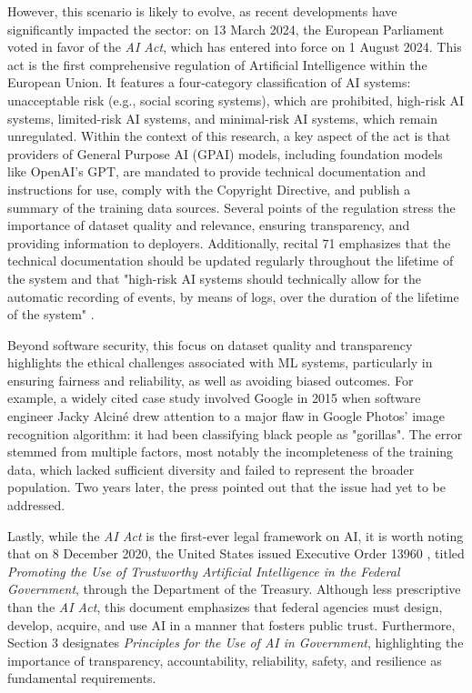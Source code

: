 However, this scenario is likely to evolve, as recent developments have significantly impacted the sector: on 13 March 2024, the European Parliament voted in favor of the \textit{AI Act}, which has entered into force on 1 August 2024.
This act is the first comprehensive regulation of Artificial Intelligence within the European Union. It features a four-category classification of AI systems: unacceptable risk (e.g., social scoring systems), which are prohibited, high-risk AI systems, limited-risk AI systems, and minimal-risk AI systems, which remain unregulated. Within the context of this research, a key aspect of the act is that providers of General Purpose AI (GPAI) models, including foundation models like OpenAI's GPT, are mandated to provide technical documentation and instructions for use, comply with the Copyright Directive, and publish a summary of the training data sources. Several points of the regulation stress the importance of dataset quality and relevance, ensuring transparency, and providing information to deployers. Additionally, recital 71 emphasizes that the technical documentation should be updated regularly throughout the lifetime of the system and that "high-risk AI systems should technically allow for the automatic recording of events, by means of logs, over the duration of the lifetime of the system" \cite{eu_ai_act_2024}.


Beyond software security, this focus on dataset quality and transparency highlights the ethical challenges associated with ML systems, particularly in ensuring fairness and reliability, as well as avoiding biased outcomes. For example, a widely cited case study \cite{winters2020software} involved Google in 2015 when software engineer Jacky Alciné drew attention to a major flaw in Google Photos' image recognition algorithm: it had been classifying black people as "gorillas". The error stemmed from multiple factors, most notably the incompleteness of the training data, which lacked sufficient diversity and failed to represent the broader population. Two years later, the press pointed out that the issue had yet to be addressed.


Lastly, while the \textit{AI Act} is the first-ever legal framework on AI, it is worth noting that on 8 December 2020, the United States issued Executive Order 13960 \cite{federalregister2020}, titled \textit{Promoting the Use of Trustworthy Artificial Intelligence in the Federal Government}, through the Department of the Treasury. Although less prescriptive than the \textit{AI Act}, this document emphasizes that federal agencies must design, develop, acquire, and use AI in a manner that fosters public trust. Furthermore, Section 3 designates \textit{Principles for the Use of AI in Government}, highlighting the importance of transparency, accountability, reliability, safety, and resilience as fundamental requirements.

